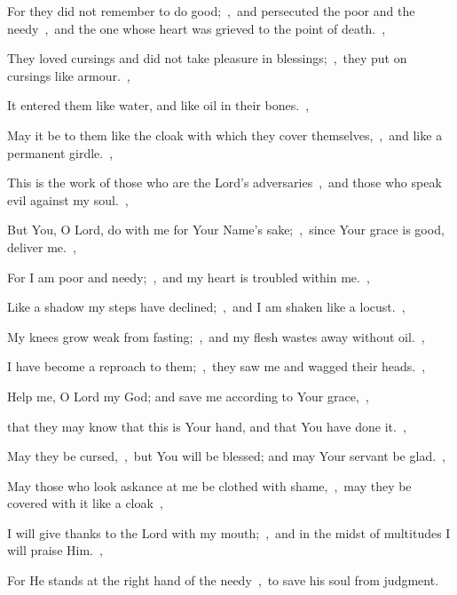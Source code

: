 \documentclass[12pt,twoside,a5paper]{article}
\begin{document}
\begin{normalparskip}
  For they did not remember to do good;~\sep\ and persecuted the poor and the needy~\sep\ and the one whose heart was grieved to the point of death.~\sep

  They loved cursings and did not take pleasure in blessings;~\sep\ they put on cursings like armour.~\sep

  It entered them like water, and like oil in their bones.~\sep

  May it be to them like the cloak with which they cover themselves,~\sep\ and like a permanent girdle.~\sep

  This is the work of those who are the Lord's adversaries~\sep\ and those who speak evil against my soul.~\sep

  But You, O Lord, do with me for Your Name's sake;~\sep\ since Your grace is good, deliver me.~\sep

  For I am poor and needy;~\sep\ and my heart is troubled within me.~\sep

  Like a shadow my steps have declined;~\sep\ and I am shaken like a locust.~\sep

  My knees grow weak from fasting;~\sep\ and my flesh wastes away without oil.~\sep

  I have become a reproach to them;~\sep\ they saw me and wagged their heads.~\sep

  Help me, O Lord my God; and save me according to Your grace,~\sep

  that they may know that this is Your hand, and that You have done it.~\sep

  May they be cursed,~\sep\ but You will be blessed; and may Your servant be glad.~\sep

  May those who look askance at me be clothed with shame,~\sep\ may they be covered with it like a cloak~\sep

  I will give thanks to the Lord with my mouth;~\sep\ and in the midst of multitudes I will praise Him.~\sep

  For He stands at the right hand of the needy~\sep\ to save his soul from judgment.
\end{normalparskip}

\end{document}

